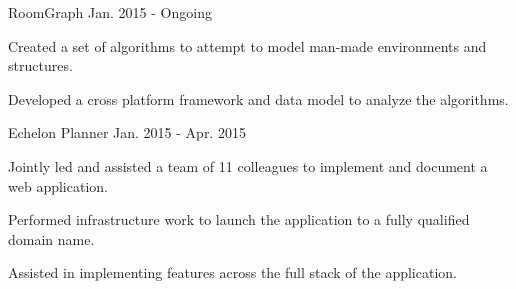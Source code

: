 

\begin{cventries}

  \cventry
    {RoomGraph} %
    {} %
    {} %
    {Jan. 2015 - Ongoing} %
    {
      \begin{cvitems} %
        \item {Created a set of algorithms to attempt to model man-made environments and structures.}
        \item {Developed a cross platform framework and data model to analyze the algorithms.}
        \\
      \end{cvitems}
    }
    
  \cventry
    {Echelon Planner} %
    {} %
    {} %
    {Jan. 2015 - Apr. 2015} %
    {
      \begin{cvitems} %
        \item {Jointly led and assisted a team of 11 colleagues to implement and document a web application.}
        \item {Performed infrastructure work to launch the application to a fully qualified domain name.}
        \item {Assisted in implementing features across the full stack of the application.}
        \\
      \end{cvitems}
    } 


\end{cventries}
